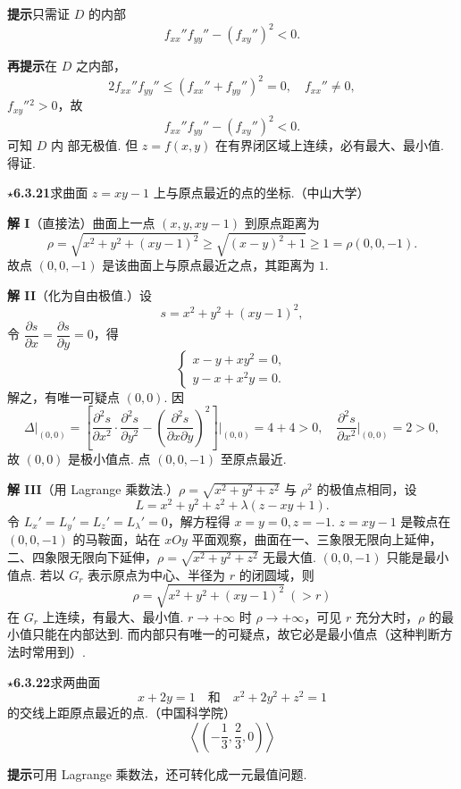 \documentclass[UTF8,12pt,a4paper,fontset=fandol]{ctexart}
\begin{document}
\noindent\textbf{提示}\quad 只需证 $D$ 的内部
\[
  f_{xx}''f_{yy}''-(f_{xy}'')^2<0.
\]

\noindent\textbf{再提示}\quad 在 $D$ 之内部，
\[
  2f_{xx}''f_{yy}''\le(f_{xx}''+f_{yy}'')^2=0,\quad f_{xx}''\ne0,
\]
$f_{xy}''{}^2>0$，故
\[
  f_{xx}''f_{yy}''-(f_{xy}'')^2<0.
\]
可知 $D$ 内
部无极值. 但 $z=f(x,y)$ 在有界闭区域上连续，必有最大、最小值. 得证.

\noindent\textbf{\ensuremath{\star}6.3.21}\quad 求曲面 $z=xy-1$ 上与原点最近的点的坐标.（中山大学）

\noindent\textbf{解 I}\quad （直接法）曲面上一点 $(x,y,xy-1)$ 到原点距离为
\[
  \rho=\sqrt{x^2+y^2+(xy-1)^2}
  \ge\sqrt{(x-y)^2+1}\ge1=\rho(0,0,-1).
\]
故点 $(0,0,-1)$ 是该曲面上与原点最近之点，其距离为 $1$.

\noindent\textbf{解 II}\quad （化为自由极值.）设
\[
  s=x^2+y^2+(xy-1)^2,
\]
令 $\dfrac{\partial s}{\partial x}=\dfrac{\partial s}{\partial y}=0$，得
\[
  \begin{cases}
    x-y+xy^2=0,\\
    y-x+x^2y=0.
  \end{cases}
\]
解之，有唯一可疑点 $(0,0)$. 因
\[
  \Delta\big|_{(0,0)}
  =\left[\frac{\partial^2s}{\partial x^2}\cdot
  \frac{\partial^2s}{\partial y^2}
  -\left(\frac{\partial^2s}{\partial x\partial y}\right)^2\right]\bigg|_{(0,0)}
  =4+4>0,\quad
  \frac{\partial^2s}{\partial x^2}\bigg|_{(0,0)}=2>0,
\]
故 $(0,0)$ 是极小值点. 点 $(0,0,-1)$ 至原点最近.

\noindent\textbf{解 III}\quad （用 Lagrange 乘数法.）$\rho=\sqrt{x^2+y^2+z^2}$ 与 $\rho^2$ 的极值点相同，设
\[
  L=x^2+y^2+z^2+\lambda(z-xy+1).
\]
令 $L_x'=L_y'=L_z'=L_\lambda'=0$，解方程得 $x=y=0,z=-1$. $z=xy-1$ 是鞍点在 $(0,0,-1)$ 的马鞍面，站在 $xOy$ 平面观察，曲面在一、三象限无限向上延伸，二、四象限无限向下延伸，$\rho=\sqrt{x^2+y^2+z^2}$ 无最大值. $(0,0,-1)$ 只能是最小值点. 若以 $G_r$ 表示原点为中心、半径为 $r$ 的闭圆域，则
\[
  \rho=\sqrt{x^2+y^2+(xy-1)^2}\ (>r)
\]
在 $G_r$ 上连续，有最大、最小值. $r\to+\infty$ 时 $\rho\to+\infty$，可见 $r$ 充分大时，$\rho$ 的最小值只能在内部达到. 而内部只有唯一的可疑点，故它必是最小值点（这种判断方法时常用到）.

\noindent\textbf{\ensuremath{\star}6.3.22}\quad 求两曲面
\[
  x+2y=1\quad\text{和}\quad x^2+2y^2+z^2=1
\]
的交线上距原点最近的点.（中国科学院）
\[
  \left\langle\left(-\frac13,\frac23,0\right)\right\rangle
\]

\noindent\textbf{提示}\quad 可用 Lagrange 乘数法，还可转化成一元最值问题.
\end{document}
